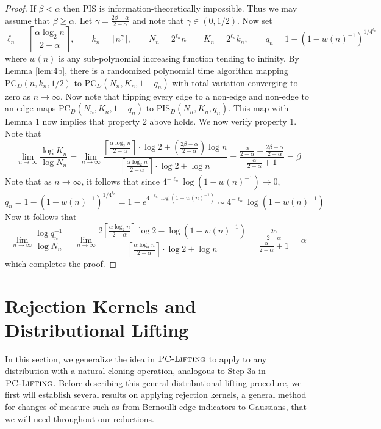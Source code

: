 \begin{proof}
If $\beta < \alpha$ then PIS is information-theoretically impossible. Thus we may assume that $\beta \ge \alpha$. Let $\gamma = \frac{2\beta - \alpha}{2 - \alpha}$ and note that $\gamma \in (0, 1/2)$. Now set
$$\ell_n = \left\lceil \frac{\alpha \log_2 n}{2 - \alpha} \right\rceil, \quad \quad k_n = \lceil n^{\gamma} \rceil, \quad \quad N_n = 2^{\ell_n} n \quad \quad K_n = 2^{\ell_n} k_n, \quad \quad q_n = 1 - (1 - w(n)^{-1})^{1/4^{\ell_n}}$$
where $w(n)$ is any sub-polynomial increasing function tending to infinity. By Lemma \ref{lem:4b}, there is a randomized polynomial time algorithm mapping $\text{PC}_D(n, k_n, 1/2)$ to $\text{PC}_D(N_n, K_n, 1 - q_n)$ with total variation converging to zero as $n \to \infty$. Now note that flipping every edge to a non-edge and non-edge to an edge maps $\text{PC}_D(N_n, K_n, 1 - q_n)$ to $\text{PIS}_D(N_n, K_n, q_n)$. This map with Lemma 1 now implies that property 2 above holds. We now verify property 1. Note that
$$\lim_{n \to \infty} \frac{\log K_n}{\log N_n} = \lim_{n \to \infty} \frac{\left\lceil \frac{\alpha \log_2 n}{2 - \alpha} \right\rceil \cdot \log 2 + \left( \frac{2\beta - \alpha}{2 - \alpha} \right) \log n}{\left\lceil \frac{\alpha \log_2 n}{2 - \alpha} \right\rceil\cdot \log 2 + \log n} = \frac{\frac{\alpha}{2 - \alpha} + \frac{2\beta - \alpha}{2 - \alpha}}{\frac{\alpha}{2 - \alpha} + 1} = \beta$$
Note that as $n \to \infty$, it follows that since $4^{-\ell_n} \log(1 - w(n)^{-1}) \to 0$,
$$q_n = 1 - (1 - w(n)^{-1})^{1/4^{\ell_n}} = 1 - e^{4^{-\ell_n} \log(1 - w(n)^{-1})} \sim 4^{-\ell_n} \log(1 - w(n)^{-1})$$
Now it follows that
$$\lim_{n \to \infty} \frac{\log q_n^{-1}}{\log N_n} = \lim_{n \to \infty} \frac{2\left\lceil \frac{\alpha \log_2 n}{2 - \alpha} \right\rceil \log 2 - \log(1 - w(n)^{-1})}{\left\lceil \frac{\alpha \log_2 n}{2 - \alpha} \right\rceil\cdot \log 2 + \log n} = \frac{\frac{2\alpha}{2 - \alpha}}{\frac{\alpha}{2 - \alpha} + 1} = \alpha$$
which completes the proof.
\end{proof}

\section{Rejection Kernels and Distributional Lifting}
\label{s:rejection}
In this section, we generalize the idea in $\textsc{PC-Lifting}$ to apply to any distribution with a natural cloning operation, analogous to Step 3a in $\textsc{PC-Lifting}$. Before describing this general distributional lifting procedure, we first will establish several results on applying rejection kernels, a general method for changes of measure such as from Bernoulli edge indicators to Gaussians, that we will need throughout our reductions.


